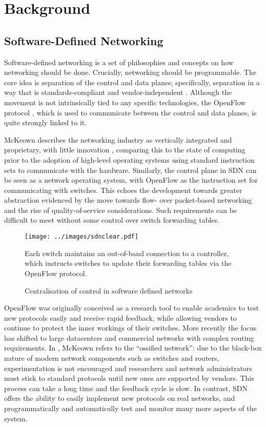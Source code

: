 \chapter{Background}

\section{Software-Defined Networking}
Software-defined networking is a set of philosophies and concepts on how networking should be done. Crucially, networking should be programmable. The core idea is separation of the control and data planes; specifically, separation in a way that is standards-compliant and vendor-independent \cite{onf:sdn}. Although the movement is not intrinsically tied to any specific technologies, the OpenFlow protocol \cite{onf:switch140}, which is used to communicate between the control and data planes, is quite strongly linked to it.

McKeown describes the networking industry as vertically integrated and proprietary, with little innovation \cite{mckeown:sdn}, comparing this to the state of computing prior to the adoption of high-level operating systems using standard instruction sets to communicate with the hardware. Similarly, the control plane in SDN can be seen as a network operating system, with OpenFlow as the instruction set for communicating with switches. This echoes the development towards greater abstraction evidenced by the move towards flow- over packet-based networking and the rise of quality-of-service considerations. Such requirements can be difficult to meet without some control over switch forwarding tables.

\begin{figure}
  \centering
  \texttt{[image: ../images/sdnclear.pdf]}
  \caption{Centralisation of control in software defined networks}
  Each switch maintains an out-of-band connection to a controller, which instructs switches to update their forwarding tables via the OpenFlow protocol.
  \label{fig:sdn}
\end{figure}

OpenFlow was originally conceived \cite{mckeown:openflow} as a research tool to enable academics to test new protocols easily and receive rapid feedback, while allowing vendors to continue to protect the inner workings of their switches. More recently \cite{onf:sdn} the focus has shifted to large datacenters and commercial networks with complex routing requirements. In \cite{mckeown:sdn}, McKeown refers to the  ``ossified network'': due to the black-box nature of modern network components such as switches and routers, experimentation is not encouraged and researchers and network administrators must stick to standard protocols until new ones are supported by vendors. This process can take a long time and the feedback cycle is slow. In contrast, SDN offers the ability to easily implement new protocols on real networks, and programmatically and automatically test and monitor many more aspects of the system.

